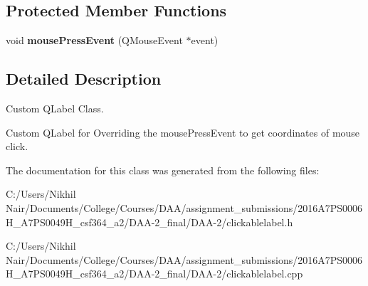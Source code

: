 \subsection*{Protected Member Functions}
\begin{DoxyCompactItemize}
\item 
\mbox{\label{class_clickable_label_a602a8b3a3fa31497f31e549d46576524}} 
void {\bfseries mouse\+Press\+Event} (Q\+Mouse\+Event $\ast$event)
\end{DoxyCompactItemize}


\subsection{Detailed Description}
Custom Q\+Label Class. 

Custom Q\+Label for Overriding the mouse\+Press\+Event to get coordinates of mouse click. 

The documentation for this class was generated from the following files\+:\begin{DoxyCompactItemize}
\item 
C\+:/\+Users/\+Nikhil Nair/\+Documents/\+College/\+Courses/\+D\+A\+A/assignment\+\_\+submissions/2016\+A7\+P\+S0006\+H\+\_\+A7\+P\+S0049\+H\+\_\+csf364\+\_\+a2/\+D\+A\+A-\/2\+\_\+final/\+D\+A\+A-\/2/clickablelabel.\+h\item 
C\+:/\+Users/\+Nikhil Nair/\+Documents/\+College/\+Courses/\+D\+A\+A/assignment\+\_\+submissions/2016\+A7\+P\+S0006\+H\+\_\+A7\+P\+S0049\+H\+\_\+csf364\+\_\+a2/\+D\+A\+A-\/2\+\_\+final/\+D\+A\+A-\/2/clickablelabel.\+cpp\end{DoxyCompactItemize}
